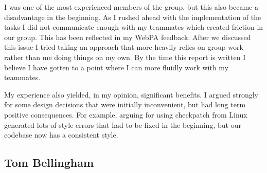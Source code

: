 \documentclass[11pt]{article}
\begin{document}
I was one of the most experienced members of the group, but this also became
a disadvantage in the beginning. As I rushed ahead with the implementation of
the tasks I did not communicate enough with my teammates which created friction
in our group. This has been reflected in my WebPA feedback. After we discussed
this issue I tried taking an approach that more heavily relies on group work
rather than me doing things on my own. By the time this report is written
I believe I have gotten to a point where I can more fluidly work with my
teammates.

My experience also yielded, in my opinion, significant benefits. I argued
strongly for some design decisions that were initially inconvenient, but had
long term positive consequences. For example, arguing for using checkpatch from
Linux generated lots of style errors that had to be fixed in the beginning, but
our codebase now has a consistent style.

\subsection{Tom Bellingham}
\end{document}

